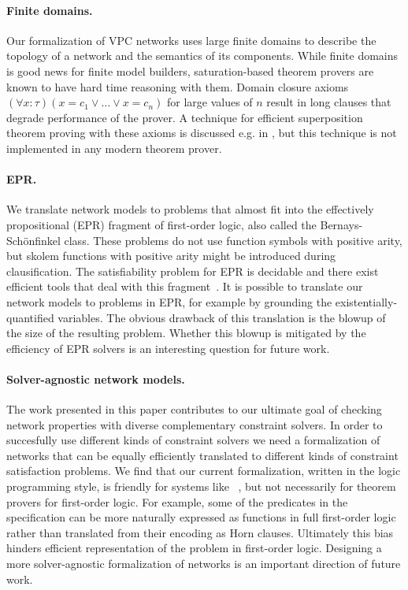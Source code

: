 \paragraph{Finite domains.}
Our formalization of VPC networks uses large finite domains to describe the topology of a network and the semantics of its components. While finite domains is good news for finite model builders, saturation-based theorem provers are known to have hard time reasoning with them. Domain closure axioms $(\forall x:\tau)(x=c_1 \vee\ldots\vee x=c_n)$ for large values of $n$ result in long clauses that degrade performance of the prover. A technique for efficient superposition theorem proving with these axioms is discussed e.g. in \cite{HillenbrandWeidenbach13}, but this technique is not implemented in any modern theorem prover.

\paragraph{EPR.}
We translate network models to problems that almost fit into the effectively propositional (EPR) fragment of first-order logic, also called the Bernays-Sch\"onfinkel class. These problems do not use function symbols with positive arity, but skolem functions with positive arity might be introduced during clausification. The satisfiability problem for EPR is decidable and there exist efficient tools that deal with this fragment~\cite{DBLP:conf/birthday/Korovin13}. It is possible to translate our network models to problems in EPR, for example by grounding the existentially-quantified variables. The obvious drawback of this translation is the blowup of the size of the resulting problem. Whether this blowup is mitigated by the efficiency of EPR solvers is an interesting question for future work.

\paragraph{Solver-agnostic network models.}
The work presented in this paper contributes to our ultimate goal of checking network properties with diverse complementary constraint solvers. In order to succesfully use different kinds of constraint solvers we need a formalization of networks that can be equally efficiently translated to different kinds of constraint satisfaction problems. We find that our current formalization, written in the logic programming style, is friendly for systems like \Datalog~\cite{Datalog}, but not necessarily for theorem provers for first-order logic. For example, some of the predicates in the specification can be more naturally expressed as functions in full first-order logic rather than translated from their encoding as Horn clauses. Ultimately this bias hinders efficient representation of the problem in first-order logic. Designing a more solver-agnostic formalization of networks is an important direction of future work.

